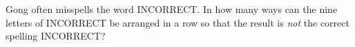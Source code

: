 Gong often misspells the word INCORRECT. In how many ways can the nine letters of INCORRECT be arranged in a row so that the result is \emph{not} the correct spelling INCORRECT?
